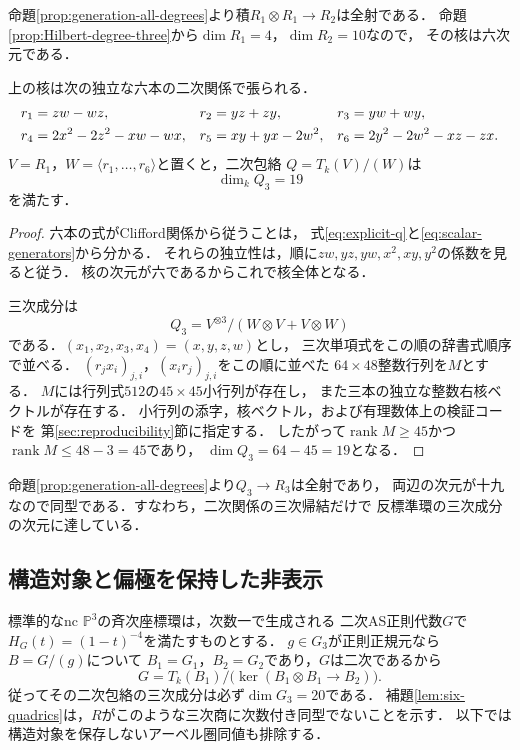 命題\ref{prop:generation-all-degrees}より積$R_1\otimes R_1\to R_2$は全射である．
命題\ref{prop:Hilbert-degree-three}から$\dim R_1=4$，$\dim R_2=10$なので，
その核は六次元である．

\begin{lemma}\label{lem:six-quadrics}
上の核は次の独立な六本の二次関係で張られる．
\begin{align}
 r_1&=zw-wz,&
 r_2&=yz+zy,&
 r_3&=yw+wy,\notag\\
 r_4&=2x^2-2z^2-xw-wx,&
 r_5&=xy+yx-2w^2,&
 r_6&=2y^2-2w^2-xz-zx.
 \label{eq:six-quadrics}
\end{align}
$V=R_1$，$W=\langle r_1,\ldots,r_6\rangle$と置くと，二次包絡
$Q=T_k(V)/(W)$は
\[
 \dim_k Q_3=19
\]
を満たす．
\end{lemma}
\begin{proof}
六本の式がClifford関係から従うことは，
式\eqref{eq:explicit-q}と\eqref{eq:scalar-generators}から分かる．
それらの独立性は，順に$zw,yz,yw,x^2,xy,y^2$の係数を見ると従う．
核の次元が六であるからこれで核全体となる．

三次成分は
\[
 Q_3=V^{\otimes3}/(W\otimes V+V\otimes W)
\]
である．$(x_1,x_2,x_3,x_4)=(x,y,z,w)$とし，
三次単項式をこの順の辞書式順序で並べる．
$(r_jx_i)_{j,i}$，$(x_ir_j)_{j,i}$をこの順に並べた
$64\times48$整数行列を$M$とする．
$M$には行列式$512$の$45\times45$小行列が存在し，
また三本の独立な整数右核ベクトルが存在する．
小行列の添字，核ベクトル，および有理数体上の検証コードを
第\ref{sec:reproducibility}節に指定する．
したがって$\operatorname{rank}M\ge45$かつ
$\operatorname{rank}M\le48-3=45$であり，
$\dim Q_3=64-45=19$となる．
\end{proof}

命題\ref{prop:generation-all-degrees}より$Q_3\to R_3$は全射であり，
両辺の次元が十九なので同型である．すなわち，二次関係の三次帰結だけで
反標準環の三次成分の次元に達している．

\subsection{構造対象と偏極を保持した非表示}

標準的なnc $\mathbb P^3$の斉次座標環は，次数一で生成される
二次AS正則代数$G$で$H_G(t)=(1-t)^{-4}$を満たすものとする．
$g\in G_3$が正則正規元なら$B=G/(g)$について
$B_1=G_1$，$B_2=G_2$であり，$G$は二次であるから
\[
 G=T_k(B_1)/\bigl(\ker(B_1\otimes B_1\longrightarrow B_2)\bigr).
\]
従ってその二次包絡の三次成分は必ず$\dim G_3=20$である．
補題\ref{lem:six-quadrics}は，$R$がこのような三次商に次数付き同型でないことを示す．
以下では構造対象を保存しないアーベル圏同値も排除する．
